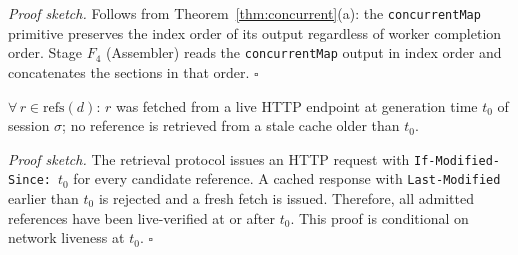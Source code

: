 \noindent\textit{Proof sketch.}
Follows from Theorem~\ref{thm:concurrent}(a): the \texttt{concurrentMap} primitive
preserves the index order of its output regardless of worker completion order.
Stage $F_4$ (Assembler) reads the \texttt{concurrentMap} output in index order and
concatenates the sections in that order. \hfill$\square$

\begin{invariant}
\label{inv:realdata}
$\forall\,r\in\mathrm{refs}(d)$: $r$ was fetched from a live HTTP endpoint at
generation time $t_0$ of session $\sigma$; no reference is retrieved from a
stale cache older than $t_0$.
\end{invariant}

\noindent\textit{Proof sketch.}
The \cgrag{} retrieval protocol issues an HTTP request with
\texttt{If-Modified-Since:}~$t_0$ for every candidate reference.
A cached response with \texttt{Last-Modified} earlier than $t_0$ is rejected and
a fresh fetch is issued.
Therefore, all admitted references have been live-verified at or after $t_0$.
This proof is conditional on network liveness at $t_0$. \hfill$\square$
